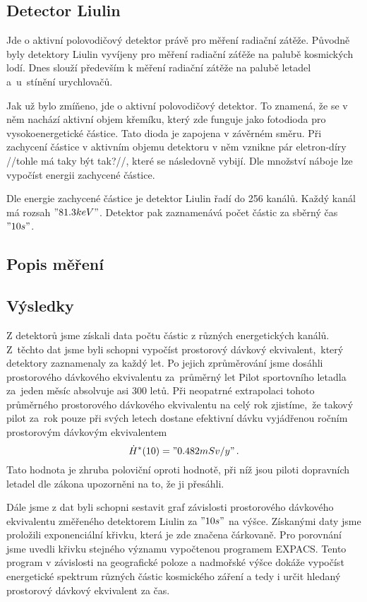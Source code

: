\documentclass[11pt,a4paper]{article}
\begin{document}
\subsection*{Detector Liulin}
Jde o aktivní polovodičový detektor právě pro měření radiační zátěže.
Původně byly detektory Liulin vyvíjeny pro měření radiační záťěže na palubě
kosmických lodí. Dnes slouží především k měření radiační zátěže na palubě letadel
a~u~stínění urychlovačů.\par
Jak už bylo zmíňeno, jde o aktivní polovodičový detektor. To znamená, že se v
něm nachází aktivní objem křemíku, který zde funguje jako fotodioda pro vysokoenergetické 
částice. Tato dioda je zapojena v závěrném směru. Při zachycení
částice v aktivním objemu detektoru v něm vznikne pár eletron-díry //tohle má taky být tak?//, které se
následovně vybijí. Dle množství náboje lze vypočíst energii zachycené
částice.\par
Dle energie zachycené částice je detektor Liulin řadí do 256 kanálů. Každý kanál
má rozsah $ "81.3 keV" $. Detektor pak zaznamenává počet částic za sběrný čas
$ "10 s" $.
\subsection*{Popis měření}

\subsection*{Výsledky}
Z detektorů jsme získali data počtu částic z různých energetických kanálů.
Z~těchto dat jsme byli schopni vypočíst prostorový dávkový ekvivalent,~který
detektory zaznamenaly za každý let. Po jejich zprůměrování jsme dosáhli
prostorového dávkového ekvivalentu za~průměrný let
Pilot sportovního letadla za~jeden měsíc absolvuje asi 300 letů. Při neopatrné
extrapolaci tohoto průměrného prostorového dávkového ekvivalentu na celý rok
zjistíme,~že takový pilot za~rok pouze při svých letech dostane efektivní dávku
vyjádřenou ročním prostorovým dávkovým ekvivalentem
$$ \dot{H}^\ast(10)="0.482 mSv/y"\,. $$
Tato hodnota je zhruba poloviční oproti hodnotě, při níž jsou piloti dopravních
letadel dle zákona upozorněni na to, že ji přesáhli.\par
Dále jsme z dat byli schopni sestavit graf závislosti prostorového dávkového
ekvivalentu změřeného detektorem Liulin za $"10 s"$ na výšce. Získanými daty
jsme proložili exponenciální křivku, která je zde značena čárkovaně. Pro
porovnání jsme uvedli křivku stejného významu vypočtenou programem EXPACS.
Tento program v závislosti na geografické poloze a nadmořské výšce dokáže
vypočíst energetické spektrum různých částic kosmického záření a tedy i určit
hledaný prostorový dávkový ekvivalent za čas.
\end{document}
